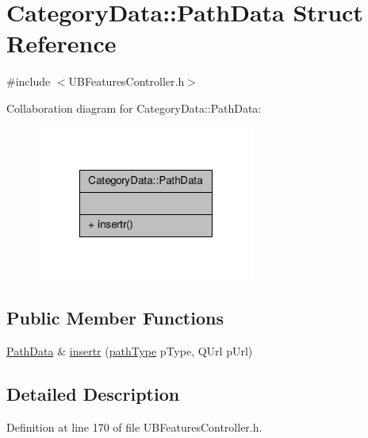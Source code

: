 \hypertarget{struct_category_data_1_1_path_data}{\section{Category\-Data\-:\-:Path\-Data Struct Reference}
\label{d5/d32/struct_category_data_1_1_path_data}
}


{\ttfamily \#include $<$U\-B\-Features\-Controller.\-h$>$}



Collaboration diagram for Category\-Data\-:\-:Path\-Data\-:
\nopagebreak
\begin{figure}[H]
\begin{center}
\leavevmode
\includegraphics[width=204pt]{d7/d5b/struct_category_data_1_1_path_data__coll__graph}
\end{center}
\end{figure}
\subsection*{Public Member Functions}
\begin{DoxyCompactItemize}
\item 
\hyperlink{struct_category_data_1_1_path_data}{Path\-Data} \& \hyperlink{struct_category_data_1_1_path_data_acd3e89a7f4fe3857bf754c81da165f5d}{insertr} (\hyperlink{struct_category_data_a69249ca5f66736ffb9fb8136d012030a}{path\-Type} p\-Type, Q\-Url p\-Url)
\end{DoxyCompactItemize}


\subsection{Detailed Description}


Definition at line 170 of file U\-B\-Features\-Controller.\-h.



